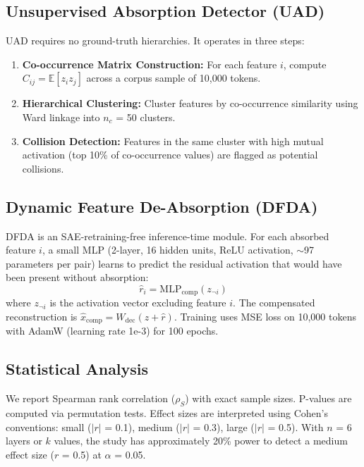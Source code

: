 \documentclass{article}
\begin{document}
\subsection{Unsupervised Absorption Detector (UAD)}

UAD requires no ground-truth hierarchies. It operates in three steps:
\begin{enumerate}
    \item \textbf{Co-occurrence Matrix Construction:} For each feature $i$, compute $C_{ij} = \mathbb{E}[z_i z_j]$ across a corpus sample of 10,000 tokens.
    \item \textbf{Hierarchical Clustering:} Cluster features by co-occurrence similarity using Ward linkage into $n_c$ = 50 clusters.
    \item \textbf{Collision Detection:} Features in the same cluster with high mutual activation (top 10\% of co-occurrence values) are flagged as potential collisions.
\end{enumerate}

\subsection{Dynamic Feature De-Absorption (DFDA)}

DFDA is an SAE-retraining-free inference-time module. For each absorbed feature $i$, a small MLP (2-layer, 16 hidden units, ReLU activation, $\sim$97 parameters per pair) learns to predict the residual activation that would have been present without absorption:
\begin{equation}
\hat{r}_i = \text{MLP}_{\text{comp}}(z_{\neg i})
\end{equation}
where $z_{\neg i}$ is the activation vector excluding feature $i$. The compensated reconstruction is $\hat{x}_{\text{comp}} = W_{\text{dec}}(z + \hat{r})$. Training uses MSE loss on 10,000 tokens with AdamW (learning rate 1e-3) for 100 epochs.

\subsection{Statistical Analysis}

We report Spearman rank correlation ($\rho_S$) with exact sample sizes. P-values are computed via permutation tests. Effect sizes are interpreted using Cohen's conventions: small ($|r|$ = 0.1), medium ($|r|$ = 0.3), large ($|r|$ = 0.5). With $n$ = 6 layers or $k$ values, the study has approximately 20\% power to detect a medium effect size ($r$ = 0.5) at $\alpha$ = 0.05.
\end{document}
